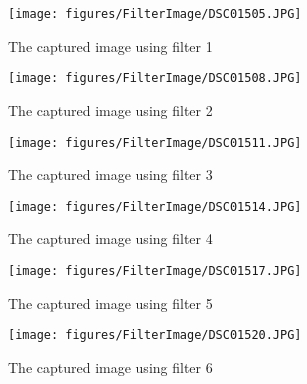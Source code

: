 \begin{figure}[H]
    \centering
    \begin{minipage}{0.45\textwidth}
        \centering
        \texttt{[image: figures/FilterImage/DSC01505.JPG]}
        \caption{The captured image using filter 1}
    \end{minipage}%
    \begin{minipage}{0.45\textwidth}
        \centering
        \texttt{[image: figures/FilterImage/DSC01508.JPG]}
        \caption{The captured image using filter 2}
    \end{minipage}%
    \vspace{1cm}
    \begin{minipage}{0.45\textwidth}
        \centering
        \texttt{[image: figures/FilterImage/DSC01511.JPG]}
        \caption{The captured image using filter 3}
    \end{minipage}%
    \begin{minipage}{0.45\textwidth}
        \centering
        \texttt{[image: figures/FilterImage/DSC01514.JPG]}
        \caption{The captured image using filter 4}
    \end{minipage}%
    \vspace{1cm}
    \begin{minipage}{0.45\textwidth}
        \centering
        \texttt{[image: figures/FilterImage/DSC01517.JPG]}
        \caption{The captured image using filter 5}
    \end{minipage}%
    \begin{minipage}{0.45\textwidth}
        \centering
        \texttt{[image: figures/FilterImage/DSC01520.JPG]}
        \caption{The captured image using filter 6}
    \end{minipage}%
\end{figure}